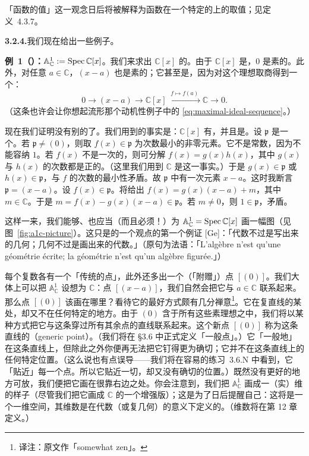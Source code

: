 「函数的值」这一观念日后将被解释为函数在一个特定的\trLocallyRingedSpace{}上的取值；见定义~4.3.7。

\textbf{3.2.4.}\quad 我们现在给出一些例子。

\textbf{例~1（\trComplex\trAffineLine）：}$\mathbb{A}^1_{\mathbb{C}}:=\operatorname{Spec}\mathbb{C}[x]$。我们来求出 $\mathbb{C}[x]$ 的\trPrimeIdeal。由于 $\mathbb{C}[x]$ 是\trIntegralDomain，$0$ 是素的。此外，对任意 $a\in\mathbb{C}$，$(x-a)$ 也是素的；它甚至是\trMaximalIdeal，因为对这个理想取商得到一个\trField：
\[
0\longrightarrow (x-a)\longrightarrow \mathbb{C}[x]\xrightarrow{\;f\mapsto f(a)\;}\mathbb{C}\longrightarrow 0.
\]
（这条\trExactSequence{}也许会让你想起流形那个动机性例子中的 \eqref{eq:maximal-ideal-sequence}。）

现在我们证明没有别的\trPrimeIdeal{}了。我们用到的事实是：$\mathbb{C}[x]$ 有\trDivisionAlgorithm，并且是\trUFD。设 $\mathfrak{p}$ 是一个\trPrimeIdeal。若 $\mathfrak{p}\neq(0)$，则取 $f(x)\in\mathfrak{p}$ 为次数最小的非零元素。它不是常数，因为\trPrimeIdeal{}不能容纳 $1$。若 $f(x)$ 不是一次的，则可分解 $f(x)=g(x)h(x)$，其中 $g(x)$ 与 $h(x)$ 的次数都是正的。（这里我们用到 $\mathbb{C}$ 是\trAlgClosedField{}这一事实。）于是 $g(x)\in\mathfrak{p}$ 或 $h(x)\in\mathfrak{p}$，与 $f$ 的次数的最小性矛盾。故 $\mathfrak{p}$ 中有一次元素 $x-a$。这时我断言 $\mathfrak{p}=(x-a)$。设 $f(x)\in\mathfrak{p}$。\trDivisionAlgorithm{}将给出 $f(x)=g(x)(x-a)+m$，其中 $m\in\mathbb{C}$。于是 $m=f(x)-g(x)(x-a)\in\mathfrak{p}$。若 $m\neq0$，则 $1\in\mathfrak{p}$，矛盾。

这样一来，我们能够、也应当（而且必须！）为 $\mathbb{A}^1_{\mathbb{C}}=\operatorname{Spec}\mathbb{C}[x]$ 画一幅图（见图~\ref{fig:a1c-picture}）。这只是的一个观点的第一个例证 [Ge]：「代数不过是写出来的几何；几何不过是画出来的代数。」（原句为法语：「L'algèbre n'est qu'une géométrie écrite; la géométrie n'est qu'un algèbre figurée.」）

每个复数各有一个「传统的点」，此外还多出一个（「附赠」）点 $[(0)]$。我们大体上可以把 $\mathbb{A}^1_{\mathbb{C}}$ 设想为 $\mathbb{C}$：点 $[(x-a)]$，我们自然会把它与 $a\in\mathbb{C}$ 联系起来。那么点 $[(0)]$ 该画在哪里？看待它的最好方式颇有几分禅意\footnote{译注：原文作「somewhat zen」。}。它在复直线的某处，却又不在任何特定的地方。由于 $(0)$ 含于所有这些素理想之中，我们将以某种方式把它与这条穿过所有其余点的直线联系起来。这个新点 $[(0)]$ 称为这条直线的\textbf{\trGenericPoint}（generic point）。（我们将在 \S3.6 中正式定义「一般点」。）它「一般地」在这条直线上，但除此之外你便再无法把它钉得更为确切；它并不在这条直线上的任何特定位置。（这么说也有点误导——我们将在容易的练习~3.6.N 中看到，它「贴近」每一个点。所以它贴近一切，却又没有确切的位置。）既然没有更好的地方可放，我们便把它画在很靠右边之处。你会注意到，我们把 $\mathbb{A}^1_{\mathbb{C}}$ 画成一（实）维的样子（尽管我们把它画成 $\mathbb{C}$ 的一个增强版）；这是为了日后提醒自己：这将是一个一维空间，其维数是在代数（或复几何）的意义下定义的。（维数将在第 12 章定义。）

